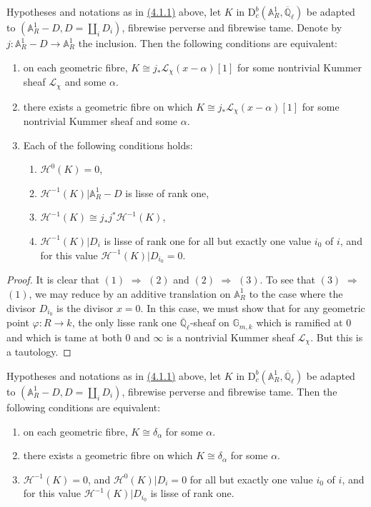 Hypotheses and notations as in \hyperref[par:4.1.1]{(4.1.1)} above, let \(K\)
in \(\mathrm{D}^b_c(\mathbb{A}^1_R,\overline{\mathbb{Q}}_\ell)\) be adapted to
\((\mathbb{A}^1_R-D,D=\coprod_iD_i)\), fibrewise perverse and fibrewise tame.
Denote by \(j:\mathbb{A}^1_R-D\to\mathbb{A}^1_R\) the inclusion. Then the
following conditions are equivalent:
\begin{enumerate}[label=(\arabic*)]
\item on each geometric fibre,
\(K\cong j_*\mathcal{L}_{\chi}(x-\alpha)[1]\) for some nontrivial Kummer sheaf
\(\mathcal{L}_\chi\) and some \(\alpha\).
\item there exists a geometric fibre on which
\(K\cong j_*\mathcal{L}_{\chi}(x-\alpha)[1]\) for some nontrivial Kummer sheaf
and some \(\alpha\).
\item Each of the following conditions holds:
  \begin{enumerate}[label=(\roman*)]
  \item \(\mathcal{H}^0(K)=0\),
  \item \(\mathcal{H}^{-1}(K)\vert\mathbb{A}^1_R-D\) is lisse of rank one,
  \item \(\mathcal{H}^{-1}(K)\cong j_*j^*\mathcal{H}^{-1}(K)\),
  \item \(\mathcal{H}^{-1}(K)\vert D_i\) is lisse of rank one for all but
  exactly one value \(i_0\) of \(i\), and for this value
  \(\mathcal{H}^{-1}(K)\vert D_{i_0}=0\).
  \end{enumerate}
\end{enumerate}

\begin{proof}
It is clear that \((1)\) \(\Rightarrow\) \((2)\) and \((2)\) \(\Rightarrow\) \((3)\). To see
that \((3)\) \(\Rightarrow\) \((1)\), we may reduce by an additive translation on
\(\mathbb{A}^1_R\) to the case where the divisor \(D_{i_0}\) is the divisor
\(x=0\). In this case, we must show that for any geometric point
\(\varphi:R\to k\), the only lisse rank one
\(\overline{\mathbb{Q}}_\ell\)-sheaf on \(\mathbb{G}_{m,k}\) which is ramified
at \(0\) and which is tame at both \(0\) and \(\infty\) is a nontrivial Kummer
sheaf \(\mathcal{L}_\chi\). But this is a tautology.
\end{proof}

Hypotheses and notations as in \hyperref[par:4.1.1]{(4.1.1)} above, let \(K\)
in \(\mathrm{D}^b_c(\mathbb{A}^1_R,\overline{\mathbb{Q}}_\ell)\) be adapted to
\((\mathbb{A}^1_R-D,D=\coprod_iD_i)\), fibrewise perverse and fibrewise tame.
Then the following conditions are equivalent:
\begin{enumerate}[label=(\arabic*)]
\item on each geometric fibre, \(K\cong\delta_\alpha\) for some \(\alpha\).
\item there exists a geometric fibre on which \(K\cong\delta_\alpha\) for some
\(\alpha\).
\item \(\mathcal{H}^{-1}(K)=0\), and
\(\mathcal{H}^0(K)\vert D_i=0\) for all but exactly one value \(i_0\) of \(i\),
and for this value \(\mathcal{H}^{-1}(K)\vert D_{i_0}\) is lisse of rank one.
\end{enumerate}


